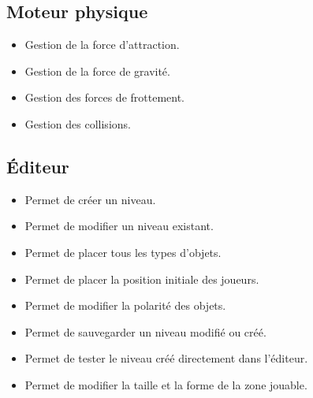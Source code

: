 \subsection{Moteur physique}

\begin{itemize}
    \item Gestion de la force d'attraction.
    \item Gestion de la force de gravité.
    \item Gestion des forces de frottement.
    \item Gestion des collisions.
\end{itemize}

\subsection{Éditeur}

\begin{itemize}
    \item Permet de créer un niveau.
    \item Permet de modifier un niveau existant.
    \item Permet de placer tous les types d'objets.
    \item Permet de placer la position initiale des joueurs.
    \item Permet de modifier la polarité des objets.
    \item Permet de sauvegarder un niveau modifié ou créé.
    \item Permet de tester le niveau créé directement dans l'éditeur.
    \item Permet de modifier la taille et la forme de la zone jouable.
\end{itemize}

